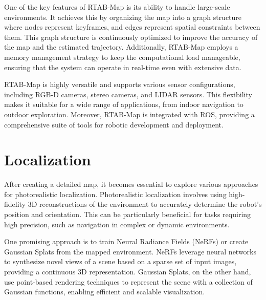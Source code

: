 One of the key features of RTAB-Map is its ability to handle large-scale environments. It achieves this by organizing the map into a graph structure where nodes represent keyframes, and edges represent spatial constraints between them. This graph structure is continuously optimized to improve the accuracy of the map and the estimated trajectory. Additionally, RTAB-Map employs a memory management strategy to keep the computational load manageable, ensuring that the system can operate in real-time even with extensive data.

RTAB-Map is highly versatile and supports various sensor configurations, including RGB-D cameras, stereo cameras, and LIDAR sensors. This flexibility makes it suitable for a wide range of applications, from indoor navigation to outdoor exploration. Moreover, RTAB-Map is integrated with ROS, providing a comprehensive suite of tools for robotic development and deployment.

\section{Localization}

After creating a detailed map, it becomes essential to explore various approaches for photorealistic localization. Photorealistic localization involves using high-fidelity 3D reconstructions of the environment to accurately determine the robot's position and orientation. This can be particularly beneficial for tasks requiring high precision, such as navigation in complex or dynamic environments.

One promising approach is to train Neural Radiance Fields (NeRFs) or create Gaussian Splats from the mapped environment. NeRFs leverage neural networks to synthesize novel views of a scene based on a sparse set of input images, providing a continuous 3D representation. Gaussian Splats, on the other hand, use point-based rendering techniques to represent the scene with a collection of Gaussian functions, enabling efficient and scalable visualization.

